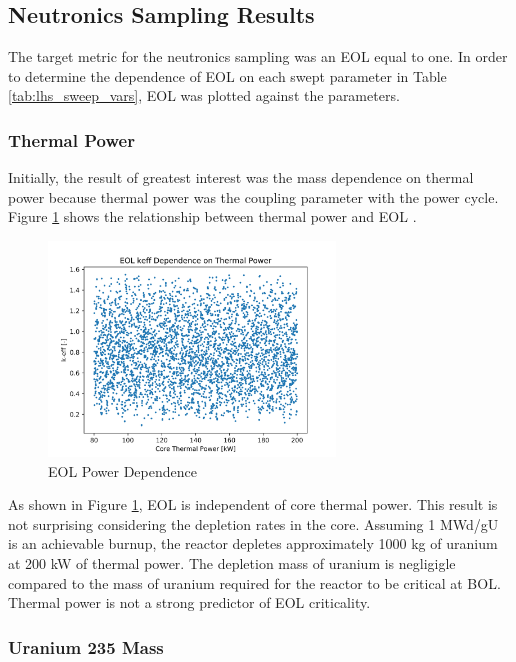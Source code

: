 \subsection{Neutronics Sampling Results}
The target metric for the neutronics sampling was an EOL \keff equal to one. In
order to determine the dependence of EOL \keff on each swept parameter in Table
\ref{tab:lhs_sweep_vars}, EOL \keff was plotted against the parameters.

\subsubsection{Thermal Power}
Initially, the result of greatest interest was the mass dependence on thermal
power because thermal power was the coupling parameter with the power cycle.
Figure \ref{fig:eol_keff_vs_power} shows the relationship between thermal power
and EOL \keff.

\begin{figure}[h]
    \centering
    \includegraphics[width=3in]{../images/keff_vs_power.png}
\caption{EOL \keff Power Dependence}
\label{fig:eol_keff_vs_power}
\end{figure}

As shown in Figure \ref{fig:eol_keff_vs_power}, EOL \keff is independent of core
thermal power. This result is not surprising considering the depletion rates in
the core. Assuming 1 MWd/gU is an achievable burnup, the reactor depletes
approximately 1000 kg of uranium at 200 kW of thermal power. The depletion mass
of uranium is negligigle compared to the mass of uranium required for the
reactor to be critical at BOL. Thermal power is not a strong predictor of EOL
criticality.

\subsubsection{Uranium 235 Mass}

